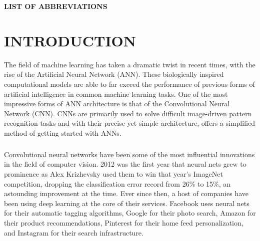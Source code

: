 \documentclass[a4paper,12pt]{report}
\begin{document}
\setcounter{page}{1}
\setcounter{tocdepth}{1}
\renewcommand\contentsname{CONTENTS}
\tableofcontents

\newpage
\vspace*{2.52cm} \hspace*{-0.88cm}
\hspace*{4.3cm}
\textbf{{\large LIST OF ABBREVIATIONS}}\\
\vspace*{0.5cm}
\begin{acronym}[AWGN]
     
\end{acronym}

\newpage
{}
\renewcommand\listfigurename{LIST OF FIGURES}
\listoffigures

\newpage
{}
\setcounter{page}{1}
\renewcommand\chaptername{CHAPTER}
\chapter{INTRODUCTION}
The field of machine learning has taken a dramatic twist in recent times, with the rise of the Artificial Neural Network (ANN). These biologically inspired computational models are able to far exceed the performance of previous forms of artificial intelligence in common machine learning tasks. One of the most impressive forms of ANN architecture is that of the Convolutional Neural Network (CNN). CNNs are primarily used to solve difficult image-driven pattern recognition tasks and with their precise yet simple architecture, offers a simplified method of getting started with ANNs.
\paragraph{}
Convolutional neural networks have been some of the most influential innovations in the field of computer vision. 2012 was the first year that neural nets grew to prominence as Alex Krizhevsky used them to win that year’s ImageNet competition, dropping the classification error record from 26\% to 15\%, an astounding improvement at the time. Ever since then, a host of companies have been using deep learning at the core of their services. Facebook uses neural nets for their automatic tagging algorithms, Google for their photo search, Amazon for their product recommendations, Pinterest for their home feed personalization, and Instagram for their search infrastructure.
\end{document}
